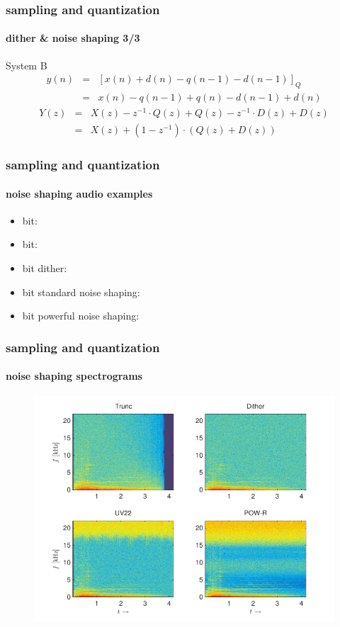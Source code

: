 	\begin{frame}\frametitle{sampling and quantization}\framesubtitle{dither \& noise shaping 3/3}
		System B
			\begin{eqnarray}
				y(n) &=& [x(n) + d(n) - q(n-1) - d(n-1)]_Q \nonumber\\
				&=& x(n)-q(n-1)+q(n)-d(n-1)+d(n)
			\end{eqnarray}
			\pause
			\begin{eqnarray}
				Y(z) &=& X(z) - z^{-1}\cdot Q(z) + Q(z) - z^{-1}\cdot D(z) + D(z)\nonumber\\
				&=& X(z) + (1-z^{-1})\cdot (Q(z) + D(z))
			\end{eqnarray}
	\end{frame}
	
	\begin{frame}\frametitle{sampling and quantization}\framesubtitle{noise shaping audio examples}
        \begin{itemize}
            \item   \unit[16]{bit}: 
            \item   \unit[8]{bit}: 
            \item   \unit[8]{bit} dither: 
            \item   \unit[8]{bit} standard noise shaping: 
            \item   \unit[8]{bit} powerful noise shaping: 
        \end{itemize}
	\end{frame}
	
	\begin{frame}\frametitle{sampling and quantization}\framesubtitle{noise shaping spectrograms}
		\begin{figure}
			\centering
				\includegraphics[scale=0.8]{Graph/noiseshaping_spectrum}
		\end{figure}
	\end{frame}
	
			        		


